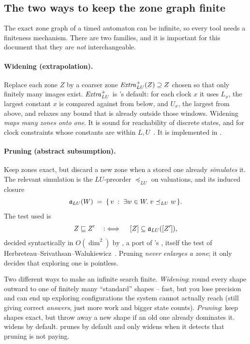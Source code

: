 \subsection{The two ways to keep the zone graph finite}
\label{sec:bg-finite}

The exact zone graph of a timed automaton can be infinite, so every tool needs
a finiteness mechanism.  There are two families, and it is important for this
document that they are \emph{not} interchangeable.

\paragraph{Widening (extrapolation).}
Replace each zone $Z$ by a coarser zone $\mathit{Extra}^{+}_{LU}(Z) \supseteq Z$ chosen so
that only finitely many images exist.  $\mathit{Extra}^{+}_{LU}$ is \uppaal{}'s default: for
each clock $x$ it uses $L_x$, the largest constant $x$ is compared against from
below, and $U_x$, the largest from above, and relaxes any bound that is already
outside those windows.  Widening \emph{maps many zones onto one}.  It is sound
for reachability of discrete states, and for clock constraints whose constants
are within $L,U$~\cite{BBLP06}.  It is implemented in
.

\paragraph{Pruning (abstract subsumption).}
Keep zones exact, but discard a new zone when a stored one already
\emph{simulates} it.  The relevant simulation is the $LU$-preorder
$\preceq_{LU}$ on valuations, and its induced closure
\[
  \mathfrak{a}_{LU}(W) \;=\; \{\, v \;:\; \exists w \in W.\; v \preceq_{LU} w \,\}.
\]
The test used is
\[
  Z \sqsubseteq Z' \quad:\iff\quad [Z] \subseteq \mathfrak{a}_{LU}([Z']),
\]
decided syntactically in $O(\dim^2)$ by , a port of
\tchecker{}'s , itself the test of
Herbreteau--Srivathsan--Walukiewicz~\cite{HSW12}.  Pruning \emph{never
enlarges a zone}; it only decides that exploring one is pointless.

\begin{intuition}
Two different ways to make an infinite search finite.  \emph{Widening}: round
every shape outward to one of finitely many ``standard'' shapes -- fast, but
you lose precision and can end up exploring configurations the system cannot
actually reach (still giving correct \emph{answers}, just more work and bigger
state counts).  \emph{Pruning}: keep shapes exact, but throw away a new shape
if an old one already dominates it.  \uppaal{} widens by default.  \tool{}
prunes by default and only widens when it detects that pruning is not paying.
\end{intuition}

